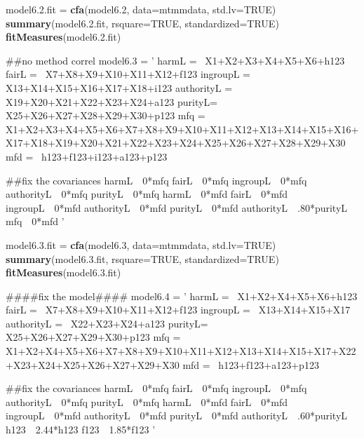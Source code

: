 \documentclass[english,man]{apa6}
\newenvironment{Shaded}{\begin{snugshade}}{\end{snugshade}}
\newcommand{\KeywordTok}[1]{\textcolor[rgb]{0.13,0.29,0.53}{\textbf{#1}}}
\newcommand{\DataTypeTok}[1]{\textcolor[rgb]{0.13,0.29,0.53}{#1}}
\newcommand{\DecValTok}[1]{\textcolor[rgb]{0.00,0.00,0.81}{#1}}
\newcommand{\FloatTok}[1]{\textcolor[rgb]{0.00,0.00,0.81}{#1}}
\newcommand{\StringTok}[1]{\textcolor[rgb]{0.31,0.60,0.02}{#1}}
\newcommand{\OtherTok}[1]{\textcolor[rgb]{0.56,0.35,0.01}{#1}}
\newcommand{\NormalTok}[1]{#1}
\theoremstyle{definition}
\theoremstyle{definition}
\theoremstyle{definition}
\theoremstyle{remark}
\begin{document}
\begin{Shaded}
\begin{Highlighting}[]
\NormalTok{model6.}\FloatTok{2.}\NormalTok{fit =}\StringTok{ }\KeywordTok{cfa}\NormalTok{(model6.}\DecValTok{2}\NormalTok{, }\DataTypeTok{data=}\NormalTok{mtmmdata, }\DataTypeTok{std.lv=}\OtherTok{TRUE}\NormalTok{)}
\KeywordTok{summary}\NormalTok{(model6.}\FloatTok{2.}\NormalTok{fit, }\DataTypeTok{rsquare=}\OtherTok{TRUE}\NormalTok{, }\DataTypeTok{standardized=}\OtherTok{TRUE}\NormalTok{)}
\KeywordTok{fitMeasures}\NormalTok{(model6.}\FloatTok{2.}\NormalTok{fit)}

\NormalTok{##no method correl}
\NormalTok{model6.}\DecValTok{3}\NormalTok{ =}\StringTok{ '}
\StringTok{harmL =~ X1+X2+X3+X4+X5+X6+h123}
\StringTok{fairL =~ X7+X8+X9+X10+X11+X12+f123}
\StringTok{ingroupL =~ X13+X14+X15+X16+X17+X18+i123}
\StringTok{authorityL =~ X19+X20+X21+X22+X23+X24+a123}
\StringTok{purityL=~ X25+X26+X27+X28+X29+X30+p123}
\StringTok{mfq =~ X1+X2+X3+X4+X5+X6+X7+X8+X9+X10+X11+X12+X13+X14+X15+X16+X17+X18+X19+X20+X21+X22+X23+X24+X25+X26+X27+X28+X29+X30}
\StringTok{mfd =~ h123+f123+i123+a123+p123}

\StringTok{##fix the covariances}
\StringTok{harmL~~0*mfq}
\StringTok{fairL~~0*mfq}
\StringTok{ingroupL~~0*mfq}
\StringTok{authorityL~~0*mfq}
\StringTok{purityL~~0*mfq}
\StringTok{harmL~~0*mfd}
\StringTok{fairL~~0*mfd}
\StringTok{ingroupL~~0*mfd}
\StringTok{authorityL~~0*mfd}
\StringTok{purityL~~0*mfd}
\StringTok{authorityL~~.80*purityL}
\StringTok{mfq~~0*mfd}
\StringTok{'}

\NormalTok{model6.}\FloatTok{3.}\NormalTok{fit =}\StringTok{ }\KeywordTok{cfa}\NormalTok{(model6.}\DecValTok{3}\NormalTok{, }\DataTypeTok{data=}\NormalTok{mtmmdata, }\DataTypeTok{std.lv=}\OtherTok{TRUE}\NormalTok{)}
\KeywordTok{summary}\NormalTok{(model6.}\FloatTok{3.}\NormalTok{fit, }\DataTypeTok{rsquare=}\OtherTok{TRUE}\NormalTok{, }\DataTypeTok{standardized=}\OtherTok{TRUE}\NormalTok{)}
\KeywordTok{fitMeasures}\NormalTok{(model6.}\FloatTok{3.}\NormalTok{fit)}

\NormalTok{####fix the model####}
\NormalTok{model6.}\DecValTok{4}\NormalTok{ =}\StringTok{ '}
\StringTok{harmL =~ X1+X2+X4+X5+X6+h123}
\StringTok{fairL =~ X7+X8+X9+X10+X11+X12+f123}
\StringTok{ingroupL =~ X13+X14+X15+X17}
\StringTok{authorityL =~ X22+X23+X24+a123}
\StringTok{purityL=~ X25+X26+X27+X29+X30+p123}
\StringTok{mfq =~ X1+X2+X4+X5+X6+X7+X8+X9+X10+X11+X12+X13+X14+X15+X17+X22+X23+X24+X25+X26+X27+X29+X30}
\StringTok{mfd =~ h123+f123+a123+p123}

\StringTok{##fix the covariances}
\StringTok{harmL~~0*mfq}
\StringTok{fairL~~0*mfq}
\StringTok{ingroupL~~0*mfq}
\StringTok{authorityL~~0*mfq}
\StringTok{purityL~~0*mfq}
\StringTok{harmL~~0*mfd}
\StringTok{fairL~~0*mfd}
\StringTok{ingroupL~~0*mfd}
\StringTok{authorityL~~0*mfd}
\StringTok{purityL~~0*mfd}
\StringTok{authorityL~~.60*purityL}
\StringTok{h123~~2.44*h123}
\StringTok{f123~~1.85*f123}
\StringTok{'}


\end{Highlighting}
\end{Shaded}
\end{document}
